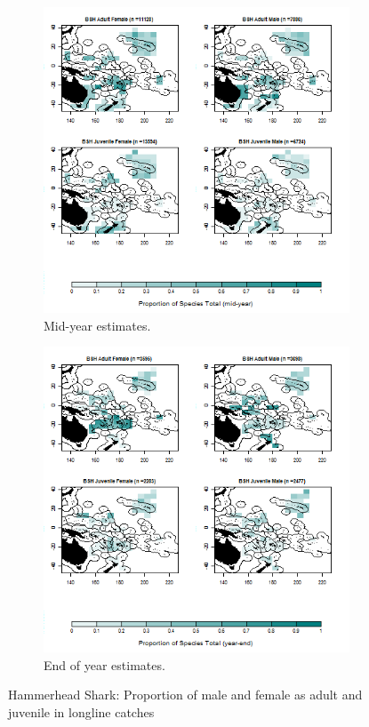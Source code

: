 \documentclass[12pt]{SCreport}
\begin{document}
\begin{landscape}
\begin{figure}
\centering
   \begin{subfigure}[b]{0.6\textwidth}
       \includegraphics[width=\textwidth]{../GRAPHICS/Map_maturity_sex_BSH_MY}
       \caption{Mid-year estimates.}
       \label{fig:test1}
   \end{subfigure}
   \begin{subfigure}[b]{0.6\textwidth}
       \includegraphics[width=\textwidth]{../GRAPHICS/Map_maturity_sex_BSH}
       \caption{End of year estimates.}
       \label{fig:test2}
   \end{subfigure}
\caption{Hammerhead Shark: Proportion of male and female as adult and juvenile in longline catches }
\label{fig:test} 
\end{figure}
\end{landscape}
\end{document}
